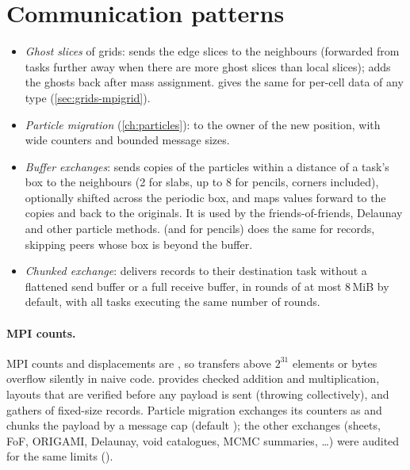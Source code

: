 \section{Communication patterns}\label{sec:par-communication}

\begin{itemize}
\item \emph{Ghost slices} of grids:  sends the edge slices to the neighbours (forwarded from
      tasks further away when there are more ghost slices than local slices); 
      adds the ghosts back after mass assignment.  gives the same for per-cell data of any type
      (\cref{sec:grids-mpigrid}).
\item \emph{Particle migration} (\cref{ch:particles}): to the owner of the new position, with wide counters and bounded
      message sizes.
\item \emph{Buffer exchanges}:  sends copies of the particles within a distance of a task's box to the
      neighbours (2 for slabs, up to 8 for pencils, corners included), optionally shifted across the periodic box, and maps
      values forward to the copies and back to the originals. It is used by the friends-of-friends, Delaunay and other particle
      methods.  (and  for pencils) does the same for records, skipping peers whose box is beyond the buffer.
\item \emph{Chunked exchange}:  delivers records to their destination task without a flattened send
      buffer or a full receive buffer, in rounds of at most 8\,MiB by default, with all tasks executing the same number of
      rounds.
\end{itemize}

\paragraph*{MPI counts.} MPI counts and displacements are , so transfers above $2^{31}$ elements or bytes overflow
silently in naive code.  provides checked addition and multiplication, layouts that are verified before
any payload is sent (throwing  collectively), and gathers of fixed-size records. Particle
migration exchanges its counters as  and chunks the payload by a message cap (default
); the other exchanges (sheets, FoF, ORIGAMI, Delaunay, void catalogues, MCMC summaries, \ldots) were audited
for the same limits ().

